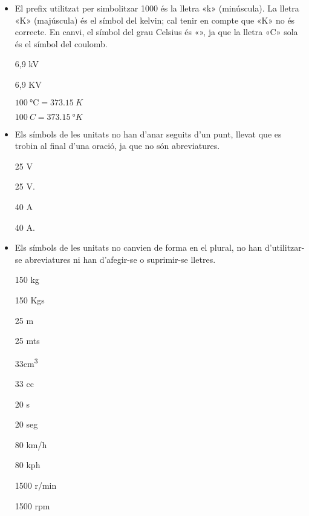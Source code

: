 \begin{itemize}

\item El prefix utilitzat per simbolitzar 1000 és la lletra «k» (minúscula).  La lletra «K» (majúscula) és el símbol del  kelvin; cal tenir en compte que «\degree K»  no és correcte. En canvi, el símbol del grau Celsius és «\celsius», ja que la lletra «C» sola és el símbol del coulomb.

\textcolor{Green}\faCheckSquare{} 6,9  kV

\textcolor{Red}\faTimesCircle{} 6,9 KV

\textcolor{Green}\faCheckSquare{} $\SI{100}{\celsius} = \SI{373,15}{K}$

\textcolor{Red}\faTimesCircle{} $\SI{100}{C} = \SI{373,15}{\degree K}$

\item Els símbols de les unitats no han d'anar seguits d'un punt, llevat que es trobin al final d'una oració, ja que no són
abreviatures.

\textcolor{Green}\faCheckSquare{} 25 V

\textcolor{Red}\faTimesCircle{} 25 V.

\textcolor{Green}\faCheckSquare{}  40 A

\textcolor{Red}\faTimesCircle{}  40 A.


\item Els símbols de les unitats no canvien de forma en el plural, no han
d'utilitzar-se abreviatures ni han d'afegir-se o suprimir-se
lletres.

\textcolor{Green}\faCheckSquare{} 150 kg

\textcolor{Red}\faTimesCircle{} 150 Kgs

\textcolor{Green}\faCheckSquare{} 25 m

\textcolor{Red}\faTimesCircle{} 25 mts

\textcolor{Green}\faCheckSquare{} 33\unit{cm^3}

\textcolor{Red}\faTimesCircle{} 33 cc

\textcolor{Green}\faCheckSquare{} 20 s

\textcolor{Red}\faTimesCircle{} 20 seg

\textcolor{Green}\faCheckSquare{} 80 km/h

\textcolor{Red}\faTimesCircle{} 80 kph

\textcolor{Green}\faCheckSquare{} 1500 r/min

\textcolor{Red}\faTimesCircle{} 1500 rpm


\end{itemize}
